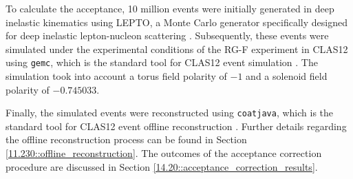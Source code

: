     To calculate the acceptance, 10 million events were initially generated in deep inelastic kinematics using LEPTO, a Monte Carlo generator specifically designed for deep inelastic lepton-nucleon scattering \cite{ingelman1997}.
    Subsequently, these events were simulated under the experimental conditions of the RG-F experiment in CLAS12 using \texttt{gemc}, which is the standard tool for CLAS12 event simulation \cite{ungaro2020gemc}.
    The simulation took into account a torus field polarity of $-1$ and a solenoid field polarity of $-0.745033$.

    Finally, the simulated events were reconstructed using \texttt{coatjava}, which is the standard tool for CLAS12 event offline reconstruction \cite{ziegler2020}.
    Further details regarding the offline reconstruction process can be found in Section \ref{11.230::offline_reconstruction}.
    The outcomes of the acceptance correction procedure are discussed in Section \ref{14.20::acceptance_correction_results}.
